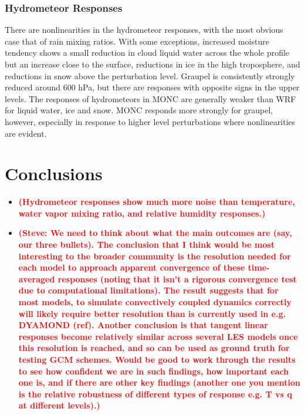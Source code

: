 \documentclass[draft]{agujournal2019}
\newcommand{\todo}[1]{\textcolor{red}{\textbf{(#1)}}}
\begin{document}
\subsubsection{Hydrometeor Responses}

There are nonlinearities in the hydrometeor responses, with the most obvious
case that of rain mixing ratios. With some exceptions, increased moisture
tendency shows a small reduction in cloud liquid water across the whole profile
but an increase close to the surface, reductions in ice in the high troposphere,
and reductions in snow above the perturbation level. Graupel is consistently
strongly reduced around 600 hPa, but there are responses with opposite signs in
the upper levels. The responses of hydrometeors in MONC are generally weaker
than WRF for liquid water, ice and snow. MONC responds more strongly for
graupel, however, especially in response to higher level perturbations where
nonlinearities are evident.

\section{Conclusions}
\label{sec:conclusions}

\begin{itemize}
\item \todo{Hydrometeor responses show much more noise than temperature, water
vapor mixing ratio, and relative humidity responses.}
\item \todo{Steve: We need to think about what the main outcomes are (say, our
three bullets).  The conclusion that I think would be most interesting to the
broader community is the resolution needed for each model to approach apparent
convergence of these time-averaged responses (noting that it isn’t a rigorous
convergence test due to computational limitations).  The result suggests that
for most models, to simulate convectively coupled dynamics correctly will likely
require better resolution than is currently used in e.g. DYAMOND \todo{ref}.
Another conclusion is that tangent linear responses become relatively similar
across several LES models once this resolution is reached, and so can be used as
ground truth for testing GCM schemes.  Would be good to work through the results
to see how confident we are in such findings, how important each one is, and if
there are other key findings (another one you mention is the relative robustness
of different types of response e.g. T vs q at different levels).}
\end{itemize}
\end{document}
